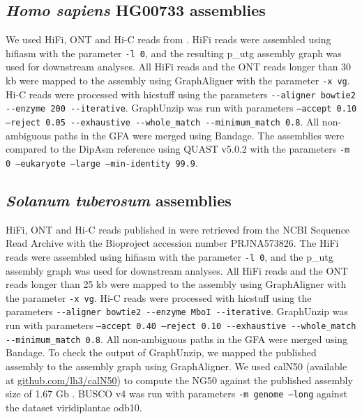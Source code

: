\subsection{\textit{Homo sapiens} HG00733 assemblies}

We used HiFi, ONT and Hi-C reads from \cite{phased_human}. HiFi reads were assembled using hifiasm with the parameter \texttt{-l 0}, and the resulting p\_utg assembly graph was used for downstream analyses. All HiFi reads and the ONT reads longer than 30 kb were mapped to the assembly using GraphAligner with the parameter \texttt{-x vg}. Hi-C reads were processed with hicstuff using the parameters \texttt{-{}-aligner bowtie2 -{}-enzyme 200 -{}-iterative}. GraphUnzip was run with parameters \texttt{--accept 0.10 --reject 0.05 -{}-exhaustive -{}-whole\_match -{}-minimum\_match 0.8}. All non-ambiguous paths in the GFA were merged using Bandage. The assemblies were compared to the DipAsm reference \cite{dipasm} using QUAST v5.0.2 \cite{quast} with the parameters \texttt{-m 0 --eukaryote --large --min-identity 99.9}. \\

\subsection{\textit{Solanum tuberosum} assemblies}

HiFi, ONT and Hi-C reads published in \cite{potato} were retrieved from the NCBI Sequence Read Archive with the Bioproject accession number PRJNA573826. The HiFi reads were assembled using hifiasm with the parameter \texttt{-l 0}, and the p\_utg assembly graph was used for downstream analyses. All HiFi reads and the ONT reads longer than 25 kb were mapped to the assembly using GraphAligner with the parameter \texttt{-x vg}. Hi-C reads were processed with hicstuff using the parameters \texttt{-{}-aligner bowtie2 -{}-enzyme MboI -{}-iterative}. GraphUnzip was run with parameters \texttt{--accept 0.40 --reject 0.10 -{}-exhaustive -{}-whole\_match -{}-minimum\_match 0.8}. All non-ambiguous paths in the GFA were merged using Bandage. To check the output of GraphUnzip, we mapped the published assembly to the assembly graph using GraphAligner. We used calN50 (available at \href{https://github.com/lh3/calN50}{github.com/lh3/calN50}) to compute the NG50 against the published assembly size of 1.67 Gb \cite{potato}. BUSCO v4 \cite{busco_evaluation} was run with parameters \texttt{-m genome --long} against the dataset viridiplantae odb10. \\

